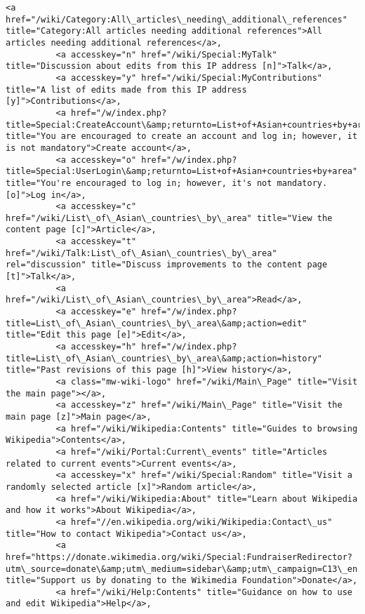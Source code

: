 \documentclass[11pt]{article}
\begin{document}
\begin{Verbatim}[commandchars=\\\{\}]
          <a href="/wiki/Category:All\_articles\_needing\_additional\_references" title="Category:All articles needing additional references">All articles needing additional references</a>,
          <a accesskey="n" href="/wiki/Special:MyTalk" title="Discussion about edits from this IP address [n]">Talk</a>,
          <a accesskey="y" href="/wiki/Special:MyContributions" title="A list of edits made from this IP address [y]">Contributions</a>,
          <a href="/w/index.php?title=Special:CreateAccount\&amp;returnto=List+of+Asian+countries+by+area" title="You are encouraged to create an account and log in; however, it is not mandatory">Create account</a>,
          <a accesskey="o" href="/w/index.php?title=Special:UserLogin\&amp;returnto=List+of+Asian+countries+by+area" title="You're encouraged to log in; however, it's not mandatory. [o]">Log in</a>,
          <a accesskey="c" href="/wiki/List\_of\_Asian\_countries\_by\_area" title="View the content page [c]">Article</a>,
          <a accesskey="t" href="/wiki/Talk:List\_of\_Asian\_countries\_by\_area" rel="discussion" title="Discuss improvements to the content page [t]">Talk</a>,
          <a href="/wiki/List\_of\_Asian\_countries\_by\_area">Read</a>,
          <a accesskey="e" href="/w/index.php?title=List\_of\_Asian\_countries\_by\_area\&amp;action=edit" title="Edit this page [e]">Edit</a>,
          <a accesskey="h" href="/w/index.php?title=List\_of\_Asian\_countries\_by\_area\&amp;action=history" title="Past revisions of this page [h]">View history</a>,
          <a class="mw-wiki-logo" href="/wiki/Main\_Page" title="Visit the main page"></a>,
          <a accesskey="z" href="/wiki/Main\_Page" title="Visit the main page [z]">Main page</a>,
          <a href="/wiki/Wikipedia:Contents" title="Guides to browsing Wikipedia">Contents</a>,
          <a href="/wiki/Portal:Current\_events" title="Articles related to current events">Current events</a>,
          <a accesskey="x" href="/wiki/Special:Random" title="Visit a randomly selected article [x]">Random article</a>,
          <a href="/wiki/Wikipedia:About" title="Learn about Wikipedia and how it works">About Wikipedia</a>,
          <a href="//en.wikipedia.org/wiki/Wikipedia:Contact\_us" title="How to contact Wikipedia">Contact us</a>,
          <a href="https://donate.wikimedia.org/wiki/Special:FundraiserRedirector?utm\_source=donate\&amp;utm\_medium=sidebar\&amp;utm\_campaign=C13\_en.wikipedia.org\&amp;uselang=en" title="Support us by donating to the Wikimedia Foundation">Donate</a>,
          <a href="/wiki/Help:Contents" title="Guidance on how to use and edit Wikipedia">Help</a>,

\end{Verbatim}
\end{document}

